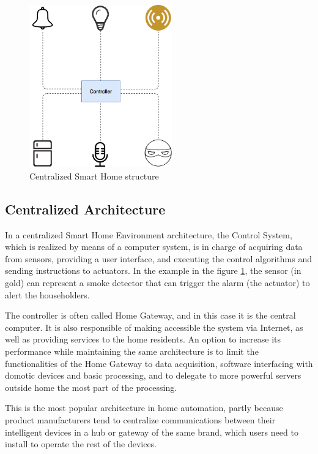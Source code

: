\begin{figure}
	\centering
	\includegraphics[width=0.55\textwidth]{images/Chapter_02/basic-sh-structure.png}
	\caption{Centralized Smart Home structure}
	\label{fig:sh-basic-structure}
\end{figure}

\subsection{Centralized Architecture}
In a centralized Smart Home Environment architecture, the Control System, which is realized by means of a computer
system, is in charge of acquiring data from sensors, providing a user interface, and executing the control algorithms and 
sending instructions to actuators.\cite{badica13} In the example in the figure \ref{fig:sh-basic-structure}, the sensor (in gold) 
can represent a smoke detector that can trigger the alarm (the actuator) to alert the householders.

\bigskip
The controller is often called Home Gateway, and in this case it is the central computer. It is also responsible of making 
accessible the system via Internet, as well as providing services to the home residents. An option to increase its performance 
while maintaining the same architecture is to limit the functionalities of the Home Gateway to data acquisition, software 
interfacing with domotic devices and basic processing, and to delegate to more powerful servers outside home the most
part of the processing.

\bigskip
This is the most popular architecture in home automation, partly because product manufacturers tend to centralize communications
between their intelligent devices in a hub or gateway of the same brand, which users need to install to operate the rest of the devices.

